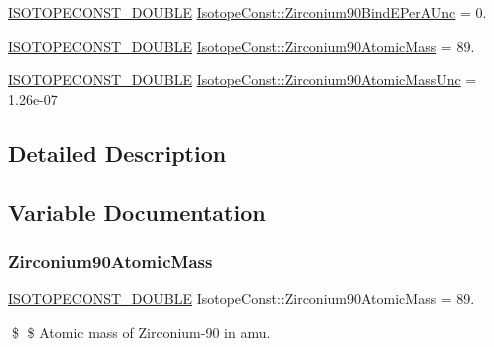 \begin{DoxyCompactItemize}
\mbox{\hyperlink{group___isotope_const-_macros_ga8f45a7272ce02c0b4c65c44636ed719a}{I\+S\+O\+T\+O\+P\+E\+C\+O\+N\+S\+T\+\_\+\+D\+O\+U\+B\+LE}} \mbox{\hyperlink{group___isotope_const-_zirconium-_zr90_gafa83608bcee99a28fd9c68d073f6e497}{Isotope\+Const\+::\+Zirconium90\+Bind\+E\+Per\+A\+Unc}} = 0.
\item 
\mbox{\hyperlink{group___isotope_const-_macros_ga8f45a7272ce02c0b4c65c44636ed719a}{I\+S\+O\+T\+O\+P\+E\+C\+O\+N\+S\+T\+\_\+\+D\+O\+U\+B\+LE}} \mbox{\hyperlink{group___isotope_const-_zirconium-_zr90_ga0707b93c5d3d57d08631cf87b01d3ecc}{Isotope\+Const\+::\+Zirconium90\+Atomic\+Mass}} = 89.
\item 
\mbox{\hyperlink{group___isotope_const-_macros_ga8f45a7272ce02c0b4c65c44636ed719a}{I\+S\+O\+T\+O\+P\+E\+C\+O\+N\+S\+T\+\_\+\+D\+O\+U\+B\+LE}} \mbox{\hyperlink{group___isotope_const-_zirconium-_zr90_ga4f53dd38f704d0aac653a3a32ee510a2}{Isotope\+Const\+::\+Zirconium90\+Atomic\+Mass\+Unc}} = 1.\+26e-\/07
\end{DoxyCompactItemize}


\subsection{Detailed Description}


\subsection{Variable Documentation}
\mbox{\label{group___isotope_const-_zirconium-_zr90_ga0707b93c5d3d57d08631cf87b01d3ecc}} 
\subsubsection{\texorpdfstring{Zirconium90\+Atomic\+Mass}{Zirconium90AtomicMass}}
{\footnotesize\ttfamily \mbox{\hyperlink{group___isotope_const-_macros_ga8f45a7272ce02c0b4c65c44636ed719a}{I\+S\+O\+T\+O\+P\+E\+C\+O\+N\+S\+T\+\_\+\+D\+O\+U\+B\+LE}} Isotope\+Const\+::\+Zirconium90\+Atomic\+Mass = 89.}

\$ \$ Atomic mass of Zirconium-\/90 in amu. \mbox{\label{group___isotope_const-_zirconium-_zr90_ga4f53dd38f704d0aac653a3a32ee510a2}} 
